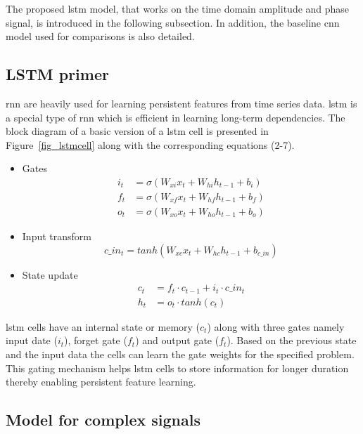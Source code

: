 The proposed \ac{lstm} model, that works on the time domain amplitude and phase signal, is introduced in the following subsection. In addition, the baseline \ac{cnn} model used for comparisons is also detailed.
\subsection{LSTM primer}
\label{lstm_primer}
\ac{rnn} are heavily used for learning persistent features from time series data. \ac{lstm} \cite{Hochreiter:lstm} is a special type of \ac{rnn} which is efficient in learning long-term dependencies. The block diagram of a basic version of a \ac{lstm} cell is presented in Figure~\ref{fig_lstmcell} along with the corresponding equations (2-7).


\begin{itemize}
\item Gates
\begin{align}
i_t &= \sigma(W_{xi}x_t + W_{hi}h_{t-1} + b_i)\\
f_t &= \sigma(W_{xf}x_t + W_{hf}h_{t-1} + b_f)\\
o_t &= \sigma(W_{xo}x_t + W_{ho}h_{t-1} + b_o)
\end{align}
\item Input transform
\begin{equation}
c\_in_t = tanh(W_{xc}x_t+W_{hc}h_{t-1}+b_{c\_in})
\end{equation}
\item State update
\begin{align}
c_t &= f_t \cdot c_{t-1}+i_t \cdot c\_in_t\\
h_t &= o_t \cdot tanh(c_t)
\end{align}
\end{itemize}



\ac{lstm} cells have an internal state or memory ($c_t$) along with three gates namely input date ($i_t$), forget gate ($f_t$) and output gate ($f_t$). Based on the previous state and the input data the cells can learn the gate weights for the specified problem. This gating mechanism helps \ac{lstm} cells to store information for longer duration thereby enabling persistent feature learning.
\subsection{Model for complex signals}\label{cmplx_lstm_model}

